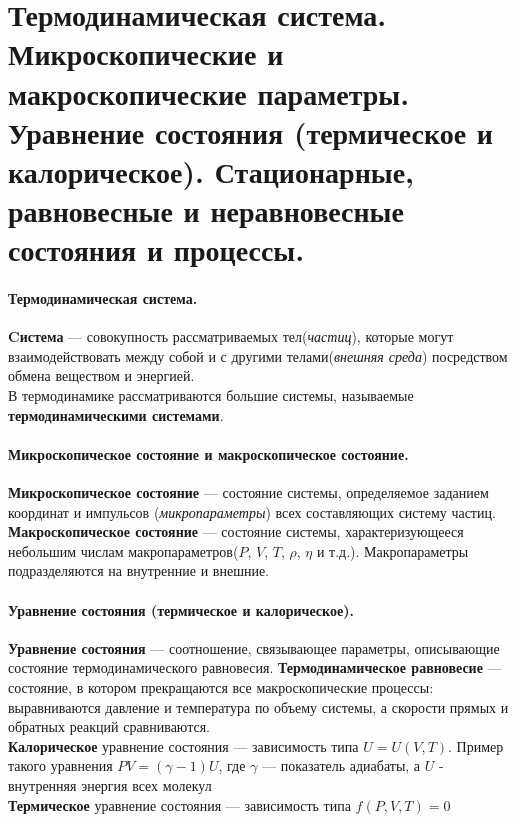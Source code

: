 \section{\normalsize Термодинамическая система. Микроскопические и макроскопические параметры. Уравнение состояния (термическое и калорическое). Стационарные, равновесные и неравновесные состояния и процессы. }
\paragraph{Термодинамическая система.}\textbf{Cистема} --- совокупность рассматриваемых тел(\textit{частиц}), которые могут взаимодействовать между собой и с другими телами(\textit{внешняя среда}) посредством обмена веществом и энергией.\\
В термодинамике рассматриваются большие системы, называемые \textbf{термодинамическими системами}.
\paragraph{Микроскопическое состояние и макроскопическое состояние.}\textbf{Микроскопическое состояние} --- состояние системы, определяемое заданием координат и импульсов (\textit{микропараметры}) всех составляющих систему частиц.\\
\textbf{Макроскопическое состояние} --- состояние системы, характеризующееся небольшим числам макропараметров($P$, $V$, $T$, $\rho$, $\eta$ и т.д.). Макропараметры подразделяются на внутренние и внешние.
\paragraph{Уравнение состояния (термическое и калорическое).}\textbf{Уравнение состояния} --- соотношение, связывающее параметры, описывающие состояние термодинамического равновесия. \textbf{Термодинамическое равновесие} --- состояние, в котором прекращаются все макроскопические процессы: выравниваются давление и температура по объему системы, а скорости прямых и обратных реакций сравниваются.\\
\textbf{Калорическое} уравнение состояния --- зависимость типа $U = U(V,T)$. Пример такого уравнения $PV = (\gamma - 1)U$, где $\gamma$ --- показатель адиабаты, а $U$ - внутренняя энергия всех молекул\\
\textbf{Термическое} уравнение состояния --- зависимость типа $f(P,V,T)=0$\\
